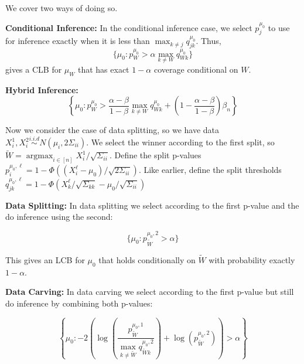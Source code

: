 \documentclass{article}
\DeclareMathOperator*{\argmax}{argmax}
\begin{document}
\begin{appendix}
We cover two ways of doing so. 

\textbf{Conditional Inference: } In the conditional inference case, we select $p^{\mu_0}_j$ to use for inference exactly when it is less than $\max_{k \neq j} q^{\mu_0}_{jk}$. Thus, 
\begin{equation*}
    \{ \mu_0 :  p^{\mu_0}_W > \alpha \max_{k \neq W} q^{\mu_0}_{Wk} \}
\end{equation*}
gives a CLB for $\mu_W$ that has exact $1-\alpha$ coverage conditional on $W$. \newline

\textbf{Hybrid Inference: }
\begin{equation*}
    \left\{ \mu_0 :  p^{\mu_0}_W > \frac{\alpha - \beta}{1-\beta} \max_{k \neq W} q^{\mu_0}_{Wk} + \left(1 - \frac{\alpha-\beta}{1-\beta} \right) \beta_n \right\}
\end{equation*}


Now we consider the case of data splitting, so we have data $X^1_{i}, X^2_{i} \overset{i.i.d}{\sim} N(\mu_i, 2\Sigma_{ii})$. We select the winner according to the first split, so $\widetilde{W} = \argmax_{i \in [n]} X^1_{i}/ \sqrt{\Sigma_{ii}}$. Define the split p-values $p^{\mu_0, \ell}_i = 1 - \Phi((X^{\ell}_{i} - \mu_0)/\sqrt{2 \Sigma_{ii}} ) $. Like earlier, define the split thresholds $q^{\mu_0, \ell}_{jk} = 1 - \Phi(X^{\ell}_k/\sqrt{\Sigma_{kk}} - \mu_0/\sqrt{\Sigma_{ii}} )$ \newline 


\textbf{Data Splitting: } In data splitting we select according to the first p-value and the do inference using the second:

\begin{equation*}
    \{\mu_0 : p^{\mu_0, 2}_{\widetilde{W}} > \alpha \}
\end{equation*}

This gives an LCB for $\mu_0$ that holds conditionally on $\tilde{W}$ with probability exactly $1-\alpha$. 



\textbf{Data Carving: } In data carving we select according to the first p-value but still do inference by combining both p-values:

\begin{equation*}
    \left\{\mu_0 : -2  \left( \log\left( \frac{p^{\mu_0, 1}_{\widetilde{W}}}{\max_{k \neq \tilde{W}} q^{\mu_0, 2}_{\widetilde{W}k}} \right) + \log\left( p^{\mu_0, 2}_{\widetilde{W}} \right)\right) > \alpha \right\}
\end{equation*}


\end{appendix}
\end{document}
